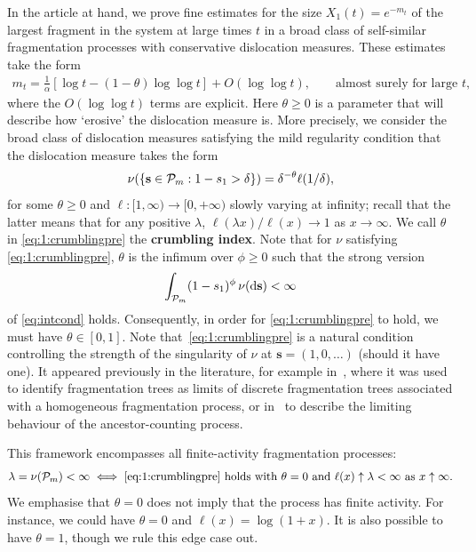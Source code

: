 \documentclass[a4,12pt]{amsart}
\numberwithin{equation}{section}
\newcommand{\MassP}{\mathcal{P}_{\rm m}}
\begin{document}
	In the article at hand, we prove fine estimates for the size $X_1(t)=e^{-m_t}$ of the 
	largest fragment in the system at large times $t$ in a broad class of self-similar 
	fragmentation processes with conservative dislocation measures. These estimates take the form
	\begin{align*}
		m_t = \frac{1}{\alpha}\left[\log t - (1 - \theta) \log \log t \right] + O(\log \log t), 
		\qquad \text{almost surely for large $t$},
	\end{align*}
	where the $O(\log \log t)$ terms are explicit. Here $\theta \geq 0$ is a parameter 
	that will describe how `erosive' the dislocation measure is. 
	More precisely, we consider the broad class of dislocation measures 
	satisfying the mild regularity condition that
	the dislocation measure 
	takes the form
	\begin{equation}\label{eq:1:crumblingpre}
		\nu( \{\mathbf{s}\in \MassP: 1- s_1 > \delta \} ) = \delta^{ - \theta} \ell(1/\delta),
	\end{equation}
	for some $\theta \geq 0$ and $\ell \colon [1,\infty) \to [0, +\infty)$ 
	slowly varying at infinity;
	recall that the latter means that for any positive $\lambda$, 
	$\ell(\lambda x)/\ell(x) \to 1$ as $x \to \infty$. 
	We call $\theta$ in \eqref{eq:1:crumblingpre} the \textbf{crumbling index}.
	Note that for $\nu$ satisfying \eqref{eq:1:crumblingpre}, $\theta$ is the infimum over
	$\phi \geq 0$ such that the strong version
	\begin{align*}
    		\int_{\MassP} (1 - s_1)^\phi \, \nu(\mathrm{d}\mathbf{s}) < \infty
   	\end{align*}
    	of \eqref{eq:intcond} holds. Consequently, in order for \eqref{eq:1:crumblingpre} 
	to hold, we must have $\theta \in [0,1]$.
	Note that~\eqref{eq:1:crumblingpre} is a natural condition controlling 
    	the strength of the singularity of 
	$\nu$ at $\mathbf{s} = (1, 0, \ldots)$ (should it have one).
	It appeared previously in the literature, for example in~\cite{haas2008continuum}, 
	where it was used to identify fragmentation trees as limits of discrete
 	fragmentation trees associated with a homogeneous fragmentation process,
	or in~\cite{haas2025ancestral} to describe the limiting 
	behaviour of the ancestor-counting process.

	This framework encompasses all finite-activity fragmentation processes:
	\begin{align*}
		\lambda = \nu(\MassP) < \infty \iff 
		\text{\eqref{eq:1:crumblingpre} holds with $\theta = 0$ and $\ell(x) \uparrow \lambda<\infty$ as $x \uparrow \infty$}.
	\end{align*}
	We emphasise that  
	$\theta = 0$ does not imply that the process has finite activity. 
	For instance, we could have $\theta =0$ and $\ell(x) = \log(1+x)$. 
    It is also possible to have $\theta = 1$, though we rule this edge case out.
\end{document}
